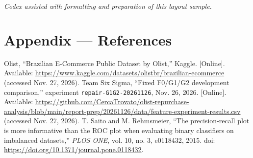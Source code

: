 \documentclass[11pt,a4paper,journal,onecolumn]{IEEEtran}
\renewcommand\normalsize{\fontsize{11bp}{22bp}\selectfont}
\renewenvironment{thebibliography}[1]{\normalsize\list{[\arabic{enumiv}]}{\setlength{\labelwidth}{15bp}\setlength{\labelsep}{5bp}\setlength{\leftmargin}{20bp}\setlength{\itemsep}{5bp}\setlength{\parsep}{0pt}\usecounter{enumiv}}\raggedright\sloppy}{\endlist}
\begin{document}
\vspace{3mm}\noindent\textit{Codex assisted with formatting and preparation of this layout sample.}

\section*{Appendix --- References}
\begin{thebibliography}{3}
 Olist, ``Brazilian E-Commerce Public Dataset by Olist,'' Kaggle. [Online]. Available: \url{https://www.kaggle.com/datasets/olistbr/brazilian-ecommerce} (accessed Nov. 27, 2026).
 Team Six Sigma, ``Fixed F0/G1/G2 development comparison,'' experiment \texttt{repair-G1G2-20261126}, Nov. 26, 2026. [Online]. Available: \url{https://github.com/CercaTrovato/olist-repurchase-analysis/blob/main/report-prep/20261126/data/feature-experiment-results.csv} (accessed Nov. 27, 2026).
 T. Saito and M. Rehmsmeier, ``The precision-recall plot is more informative than the ROC plot when evaluating binary classifiers on imbalanced datasets,'' \textit{PLOS ONE}, vol. 10, no. 3, e0118432, 2015. doi: \url{https://doi.org/10.1371/journal.pone.0118432}.
\end{thebibliography}
\end{document}
